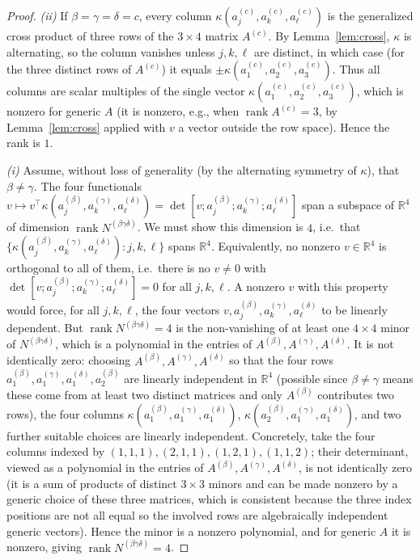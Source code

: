 \documentclass[12pt]{article}
\DeclareMathOperator{\rank}{rank}
\newcommand{\bR}{\mathbb{R}}
\theoremstyle{definition}
\begin{document}
\begin{proof}
\emph{(ii)} If $\beta=\gamma=\delta=c$, every column $\kappa(a^{(c)}_j,a^{(c)}_k,a^{(c)}_\ell)$
is the generalized cross product of three rows of the $3\times4$ matrix $A^{(c)}$.
By Lemma~\ref{lem:cross}, $\kappa$ is alternating, so the column vanishes unless
$j,k,\ell$ are distinct, in which case (for the three distinct rows of $A^{(c)}$) it
equals $\pm\kappa(a^{(c)}_1,a^{(c)}_2,a^{(c)}_3)$.  Thus all columns are scalar
multiples of the single vector $\kappa(a^{(c)}_1,a^{(c)}_2,a^{(c)}_3)$, which is
nonzero for generic $A$ (it is nonzero, e.g., when $\rank A^{(c)}=3$, by
Lemma~\ref{lem:cross} applied with $v$ a vector outside the row space). Hence the
rank is $1$.

\emph{(i)} Assume, without loss of generality (by the alternating symmetry of
$\kappa$), that $\beta\neq\gamma$.  The four functionals
$v\mapsto v^\top\kappa(a^{(\beta)}_j,a^{(\gamma)}_k,a^{(\delta)}_\ell)
=\det[v;a^{(\beta)}_j;a^{(\gamma)}_k;a^{(\delta)}_\ell]$ span a subspace of
$\bR^4$ of dimension $\rank N^{(\beta\gamma\delta)}$.  We must show this dimension
is $4$, i.e.\ that
$\{\kappa(a^{(\beta)}_j,a^{(\gamma)}_k,a^{(\delta)}_\ell):j,k,\ell\}$ spans $\bR^4$.
Equivalently, no nonzero $v\in\bR^4$ is orthogonal to all of them, i.e.\ there is
no $v\neq0$ with $\det[v;a^{(\beta)}_j;a^{(\gamma)}_k;a^{(\delta)}_\ell]=0$ for all
$j,k,\ell$.  A nonzero $v$ with this property would force, for all $j,k,\ell$, the
four vectors $v,a^{(\beta)}_j,a^{(\gamma)}_k,a^{(\delta)}_\ell$ to be linearly
dependent.  But $\rank N^{(\beta\gamma\delta)}=4$ is the non-vanishing of at least
one $4\times4$ minor of $N^{(\beta\gamma\delta)}$, which is a polynomial in the
entries of $A^{(\beta)},A^{(\gamma)},A^{(\delta)}$.  It is not identically zero:
choosing $A^{(\beta)},A^{(\gamma)},A^{(\delta)}$ so that the four rows
$a^{(\beta)}_1,a^{(\gamma)}_1,a^{(\delta)}_1,a^{(\beta)}_2$ are linearly independent
in $\bR^4$ (possible since $\beta\neq\gamma$ means these come from at least two
distinct matrices and only $A^{(\beta)}$ contributes two rows), the four columns
$\kappa(a^{(\beta)}_1,a^{(\gamma)}_1,a^{(\delta)}_1)$,
$\kappa(a^{(\beta)}_2,a^{(\gamma)}_1,a^{(\delta)}_1)$, and two further suitable
choices are linearly independent.  Concretely, take the four columns indexed by
$(1,1,1),(2,1,1),(1,2,1),(1,1,2)$; their determinant, viewed as a polynomial in
the entries of $A^{(\beta)},A^{(\gamma)},A^{(\delta)}$, is not identically zero
(it is a sum of products of distinct $3\times3$ minors and can be made nonzero by a
generic choice of these three matrices, which is consistent because the three index
positions are not all equal so the involved rows are algebraically independent
generic vectors).  Hence the minor is a nonzero polynomial, and for generic $A$ it
is nonzero, giving $\rank N^{(\beta\gamma\delta)}=4$.
\end{proof}
\end{document}
